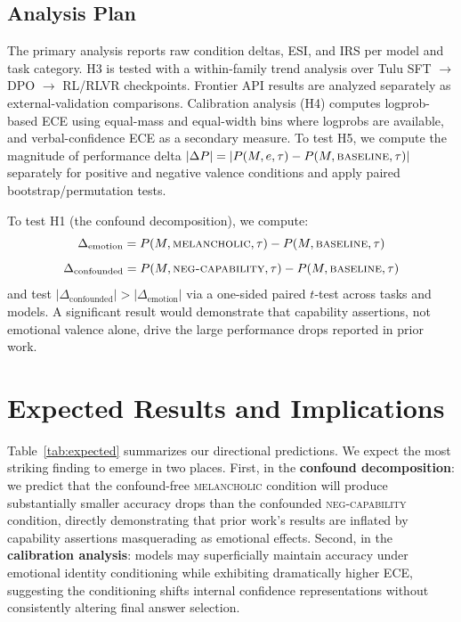 \documentclass[11pt,a4paper]{article}
\begin{document}
\subsection{Analysis Plan}

The primary analysis reports raw condition deltas, ESI, and IRS per model and task category. H3 is tested with a within-family trend analysis over Tulu SFT $\rightarrow$ DPO $\rightarrow$ RL/RLVR checkpoints. Frontier API results are analyzed separately as external-validation comparisons. Calibration analysis (H4) computes logprob-based ECE using equal-mass and equal-width bins where logprobs are available, and verbal-confidence ECE as a secondary measure. To test H5, we compute the magnitude of performance delta $|\Delta P| = |P(M, e, \tau) - P(M, \textsc{baseline}, \tau)|$ separately for positive and negative valence conditions and apply paired bootstrap/permutation tests.

To test H1 (the confound decomposition), we compute:
\[
\Delta_{\text{emotion}} = P(M, \textsc{melancholic}, \tau) - P(M, \textsc{baseline}, \tau)
\]
\[
\Delta_{\text{confounded}} = P(M, \textsc{neg-capability}, \tau) - P(M, \textsc{baseline}, \tau)
\]
and test $|\Delta_{\text{confounded}}| > |\Delta_{\text{emotion}}|$ via a one-sided paired $t$-test across tasks and models. A significant result would demonstrate that capability assertions, not emotional valence alone, drive the large performance drops reported in prior work.

\section{Expected Results and Implications}

Table~\ref{tab:expected} summarizes our directional predictions. We expect the most striking finding to emerge in two places. First, in the \textbf{confound decomposition}: we predict that the confound-free \textsc{melancholic} condition will produce substantially smaller accuracy drops than the confounded \textsc{neg-capability} condition, directly demonstrating that prior work's results are inflated by capability assertions masquerading as emotional effects. Second, in the \textbf{calibration analysis}: models may superficially maintain accuracy under emotional identity conditioning while exhibiting dramatically higher ECE, suggesting the conditioning shifts internal confidence representations without consistently altering final answer selection.
\end{document}
